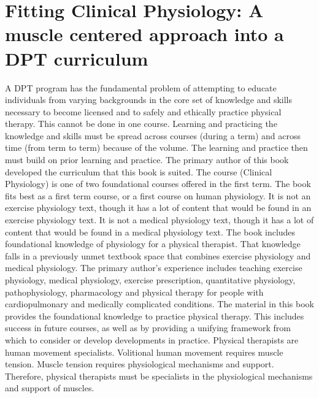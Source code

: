 \section*{Fitting Clinical Physiology: A muscle centered approach into a DPT curriculum}
A DPT program has the fundamental problem of attempting to educate individuals from varying backgrounds in the core set of knowledge and skills necessary to become licensed and to safely and ethically practice physical therapy. This cannot be done in one course. Learning and practicing the knowledge and skills must be spread across courses (during a term) and across time (from term to term) because of the volume.  The learning and practice then must build on prior learning and practice. The primary author of this book developed the curriculum that this book is suited. The course (Clinical Physiology) is one of two foundational courses offered in the first term.\footnotemark{} The book fits best as a first term course, or a first course on human physiology.\footnotemark{} It is not an exercise physiology text, though it has a lot of content that would be found in an exercise physiology text. It is not a medical physiology text, though it has a lot of content that would be found in a medical physiology text. The book includes foundational knowledge of physiology for a physical therapist. That knowledge falls in a previously unmet textbook space that combines exercise physiology and medical physiology. The primary author's experience includes teaching exercise physiology, medical physiology, exercise prescription, quantitative physiology, pathophysiology, pharmacology and physical therapy for people with cardiopulmonary and medically complicated conditions. The material in this book provides the foundational knowledge to practice physical therapy. This includes success in future courses, as well as by providing a unifying framework from which to consider or develop developments in practice. Physical therapists are human movement specialists. Volitional human movement requires muscle tension. Muscle tension requires physiological mechanisms and support. Therefore, physical therapists must be specialists in the physiological mechanisms and support of muscles.

